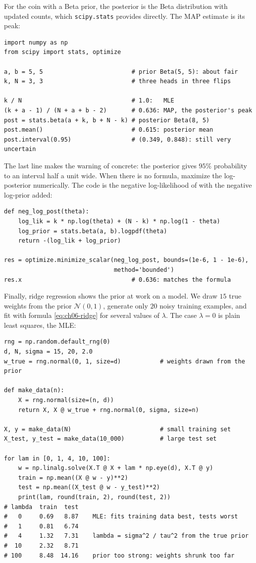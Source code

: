 For the coin with a Beta prior, the posterior is the Beta distribution
with updated counts, which \texttt{scipy.stats} provides directly. The
MAP estimate is its peak:

\begin{lstlisting}
import numpy as np
from scipy import stats, optimize

a, b = 5, 5                         # prior Beta(5, 5): about fair
k, N = 3, 3                         # three heads in three flips

k / N                               # 1.0:   MLE
(k + a - 1) / (N + a + b - 2)       # 0.636: MAP, the posterior's peak
post = stats.beta(a + k, b + N - k) # posterior Beta(8, 5)
post.mean()                         # 0.615: posterior mean
post.interval(0.95)                 # (0.349, 0.848): still very uncertain
\end{lstlisting}

The last line makes the warning of  concrete:
the posterior gives $95\%$ probability to an interval half a unit wide.
When there is no formula, maximize the log-posterior numerically. The
code is the negative log-likelihood of  with the
negative log-prior added:

\begin{lstlisting}
def neg_log_post(theta):
    log_lik = k * np.log(theta) + (N - k) * np.log(1 - theta)
    log_prior = stats.beta(a, b).logpdf(theta)
    return -(log_lik + log_prior)

res = optimize.minimize_scalar(neg_log_post, bounds=(1e-6, 1 - 1e-6),
                               method='bounded')
res.x                               # 0.636: matches the formula
\end{lstlisting}

Finally, ridge regression shows the prior at work on a model. We draw
$15$ true weights from the prior $\mathcal{N}(0, 1)$, generate only $20$
noisy training examples, and fit with formula \eqref{eq:ch06-ridge} for
several values of $\lambda$. The case $\lambda = 0$ is plain least
squares, the MLE:

\begin{lstlisting}
rng = np.random.default_rng(0)
d, N, sigma = 15, 20, 2.0
w_true = rng.normal(0, 1, size=d)           # weights drawn from the prior

def make_data(n):
    X = rng.normal(size=(n, d))
    return X, X @ w_true + rng.normal(0, sigma, size=n)

X, y = make_data(N)                         # small training set
X_test, y_test = make_data(10_000)          # large test set

for lam in [0, 1, 4, 10, 100]:
    w = np.linalg.solve(X.T @ X + lam * np.eye(d), X.T @ y)
    train = np.mean((X @ w - y)**2)
    test = np.mean((X_test @ w - y_test)**2)
    print(lam, round(train, 2), round(test, 2))
# lambda  train  test
#   0     0.69   8.87    MLE: fits training data best, tests worst
#   1     0.81   6.74
#   4     1.32   7.31    lambda = sigma^2 / tau^2 from the true prior
#  10     2.32   8.71
# 100     8.48  14.16    prior too strong: weights shrunk too far
\end{lstlisting}

